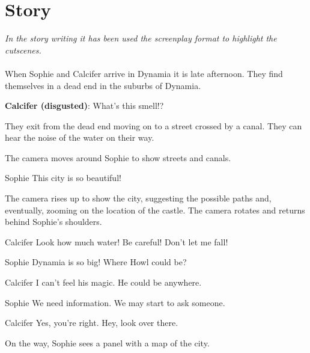 \section{Story}

\textit{In the story writing it has been used the screenplay format to highlight the cutscenes.}\\\\

When Sophie and Calcifer arrive in Dynamia it is late afternoon. They find themselves in a dead end in the suburbs of Dynamia.

\textbf{Calcifer (disgusted)}: What’s this smell!?

They exit from the dead end moving on to a street crossed by a canal. They can hear the noise of the water on their way.

\begin{screenplay}

The camera  moves around Sophie to show streets and canals. 

\begin{dialogue}[amazed]{Sophie}
This city is so beautiful!
\end{dialogue}

The camera rises up to show the city, suggesting the possible paths and, eventually,  zooming on the location of the castle. The camera rotates and returns behind Sophie's shoulders. 

\begin{dialogue}[worried]{Calcifer}
Look how much water! Be careful! Don’t let me fall!
\end{dialogue}

\begin{dialogue}[discouraged]{Sophie}
Dynamia is so big! Where Howl could be?
\end{dialogue}

\begin{dialogue}{Calcifer}
I can’t feel his magic. He could be anywhere.
\end{dialogue}

\begin{dialogue}[resolute]{Sophie}
We need information. We may start to ask someone.
\end{dialogue}

\begin{dialogue}{Calcifer}
Yes, you're right. Hey, look over there.
\end{dialogue}

On the way, Sophie sees a panel with a map of the city.


\end{screenplay}
